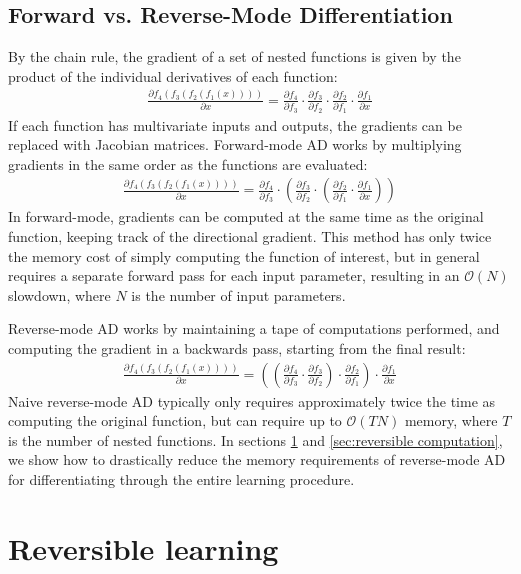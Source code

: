 \documentclass{article}
\newcommand{\pderiv}[2]{\frac{\partial #1}{\partial #2}}
\newcommand{\numhypers}{N}
\newcommand{\numsteps}{T}
\begin{document}
\subsection{Forward vs. Reverse-Mode Differentiation}
By the chain rule, the gradient of a set of nested functions is given by the product of the individual derivatives of each function:
%
\begin{align*}
\pderiv{f_4(f_3(f_2(f_1(x))))}{x} = \pderiv{f_4}{f_3} \cdot \pderiv{f_3}{f_2} \cdot \pderiv{f_2}{f_1} \cdot \pderiv{f_1}{x}
\end{align*}
If each function has multivariate inputs and outputs, the gradients can be replaced with Jacobian matrices.
%
Forward-mode AD works by multiplying gradients in the same order as the functions are evaluated:
%
\begin{align*}
\pderiv{f_4(f_3(f_2(f_1(x))))}{x} = \pderiv{f_4}{f_3} \cdot \left( \pderiv{f_3}{f_2} \cdot \left( \pderiv{f_2}{f_1} \cdot \pderiv{f_1}{x} \right) \right)
\end{align*}
%
In forward-mode, gradients can be computed at the same time as the original function, keeping track of the directional gradient.
This method has only twice the memory cost of simply computing the function of interest, but in general requires a separate forward pass for each input parameter, resulting in an $\mathcal{O}(\numhypers)$ slowdown, where $\numhypers$ is the number of input parameters.~\cite{pearlmutter2008reverse}

Reverse-mode AD works by maintaining a tape of computations performed, and computing the gradient in a backwards pass, starting from the final result:
%
\begin{align*}
\pderiv{f_4(f_3(f_2(f_1(x))))}{x} = \left(  \left(  \pderiv{f_4}{f_3} \cdot \pderiv{f_3}{f_2} \right) \cdot \pderiv{f_2}{f_1} \right) \cdot \pderiv{f_1}{x} 
\end{align*}
%
Naive reverse-mode AD typically only requires approximately twice the time as computing the original function, but can require up to $\mathcal{O}(\numsteps\numhypers)$ memory, where $\numsteps$ is the number of nested functions.
In sections \ref{sec:reversible learning} and \ref{sec:reversible computation}, we show how to drastically reduce the memory requirements of reverse-mode AD for differentiating through the entire learning procedure.

\section{Reversible learning}
\label{sec:reversible learning}
\end{document}

